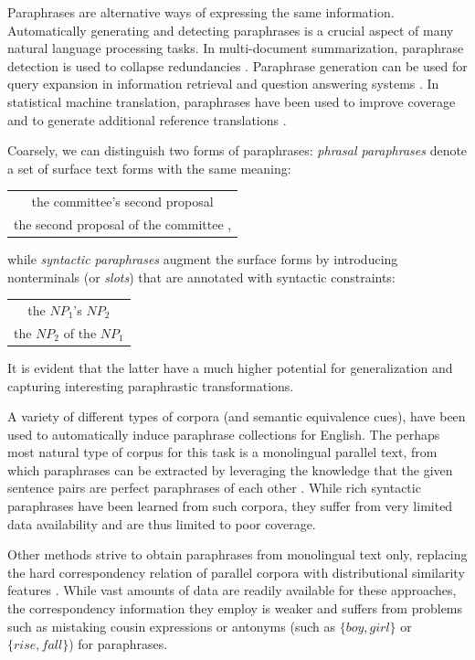 \documentclass[11pt]{article}
\begin{document}
Paraphrases are alternative ways of expressing the same information. 
Automatically generating and detecting paraphrases is a crucial aspect of many 
natural language processing tasks.
In multi-document summarization, paraphrase detection is used
to collapse redundancies \cite{Barzilay1999}. Paraphrase generation can be used 
for query expansion in information retrieval and question
answering systems \cite{mckeown:1979:ACL,Anick1999,Ravichandran2002,Riezler2007}. 
In statistical machine translation, paraphrases have been used to improve coverage
and to generate additional reference translations
 \cite{Callison-Burch2006b,Madnani2007}.

Coarsely, we can distinguish two forms of paraphrases: \emph{phrasal
  paraphrases} denote a set of surface text forms with the same
meaning:
\begin{center}
\begin{tabular}{c}
the committee's second proposal \\
the second proposal of the committee ,
\end{tabular}
\end{center}
while \emph{syntactic paraphrases} augment the surface forms by
introducing nonterminals (or \emph{slots}) that are annotated with
syntactic constraints:
\begin{center}
\begin{tabular}{c}
the $\mathit{NP}_1$'s $\mathit{NP}_2$ \\
the $\mathit{NP}_2$ of the $\mathit{NP}_1$
\end{tabular}
\end{center}
It is evident that the latter have a much higher potential for
generalization and capturing interesting paraphrastic transformations.

A variety of different types of corpora (and semantic equivalence
cues), have been used to automatically induce paraphrase collections
for English. The perhaps most natural type of corpus for this task is
a monolingual parallel text, from which paraphrases can be extracted
by leveraging the knowledge that the given sentence pairs are perfect
paraphrases of each other \cite{Barzilay1999,Pang2003}. While rich
syntactic paraphrases have been learned from such corpora, they suffer
from very limited data availability and are thus limited to poor
coverage.

Other methods strive to obtain paraphrases from monolingual text only,
replacing the hard correspondency relation of parallel corpora with
distributional similarity features \cite{Lin2001,Bhagat2008}. While
vast amounts of data are readily available for these approaches, the
correspondency information they employ is weaker and suffers from
problems such as mistaking cousin expressions or antonyms (such as
$\{\mathit{boy}, \mathit{girl}\}$ or $\{\mathit{rise},
\mathit{fall}\}$) for paraphrases.
\end{document}
